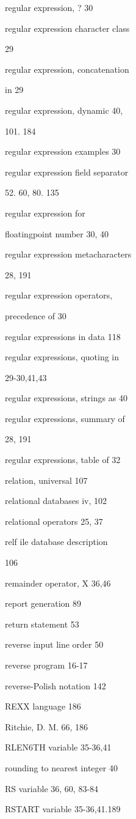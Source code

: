 \begin{multicols}{3}
regular expression, ? 30

regular expression character class

29

regular expression, concatenation

in 29

regular expression, dynamic 40,

101. 184

regular expression examples 30

regular expression field separator

52. 60, 80. 135

regular expression for 

floatingpoint number 30, 40



regular expression metacharacters

28, 191

regular expression operators,

precedence of 30

regular expressions in data 118

regular expressions, quoting in

29-30,41,43

regular expressions, strings as 40

regular expressions, summary of

28, 191

regular expressions, table of 32

relation, universal 107

relational databases iv, 102

relational operators 25, 37

relf ile database description

106

remainder operator, X 36,46

report generation 89

return statement 53

reverse input line order 50

reverse program 16-17

reverse-Polish notation 142

REXX language 186

Ritchie, D. M. 66, 186

RLEN6TH variable 35-36,41

rounding to nearest integer 40

RS variable 36, 60, 83-84

RSTART variable 35-36,41.189


\end{multicols}
